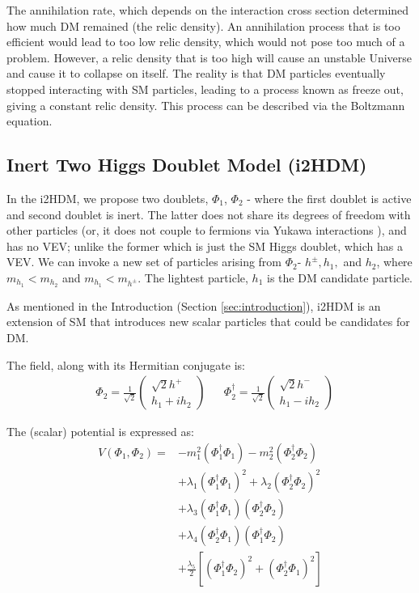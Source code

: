 \documentclass[12pt]{article}
\begin{document}
The annihilation rate, which depends on the interaction cross section determined how much DM remained (the relic density). An annihilation process that is too efficient would lead to too low relic density, which would not pose too much of a problem. However, a relic density that is too high will cause an unstable Universe and cause it to collapse on itself. The reality is that DM particles eventually stopped interacting with SM particles, leading to a process known as freeze out, giving a constant relic density. This process can be described via the Boltzmann equation.

\subsection{Inert Two Higgs Doublet Model (i2HDM)}
\label{sec:i2HDM}
In the i2HDM, we propose two doublets, $\Phi_1$, $\Phi_2$ - where the first doublet is active and second doublet is inert. The latter does not share its degrees of freedom with other particles (or, it does not couple to fermions via Yukawa interactions \cite{Belyaev_2022}), and has no VEV; unlike the former which is just the SM Higgs doublet, which has a VEV. We can invoke a new set of particles arising from $\Phi_2$- $h^\pm, h_1,$ and $h_2$, where $m_{h_1} < m_{h_2}$ and $m_{h_1} < m_{h^\pm}$. The lightest particle, $h_1$ is the DM candidate particle.

As mentioned in the Introduction (Section \ref{sec:introduction}), i2HDM is an extension of SM that introduces new scalar particles that could be candidates for DM.

The field, along with its Hermitian conjugate is:
\begin{align}
    &\Phi_2 = \frac{1}{\sqrt{2}}
        \begin{pmatrix}
            {\sqrt{2}h^+} \\
            {h_1 + ih_2 }
        \end{pmatrix}&
    &\Phi_2^\dagger = \frac{1}{\sqrt{2}} 
        \begin{pmatrix}
            {\sqrt{2}h^-} \\
            {h_1 - ih_2 }
        \end{pmatrix}
\end{align} 

The (scalar) potential is expressed as:
\begin{equation}
    \begin{split}
        V(\Phi_1, \Phi_2) =& -m_1^2(\Phi_1^\dagger\Phi_1) - m_2^2(\Phi_2^\dagger\Phi_2)\\ 
        &+ \lambda_1(\Phi_1^\dagger\Phi_1)^2 + \lambda_2(\Phi_2^\dagger\Phi_2)^2 \\
        &+ \lambda_3(\Phi_1^\dagger\Phi_1)(\Phi_2^\dagger\Phi_2) \\
        &+ \lambda_4(\Phi_2^\dagger\Phi_1)(\Phi_1^\dagger\Phi_2)\\ 
        &+ \frac{\lambda_5}{2}[(\Phi_1^\dagger\Phi_2)^2 + (\Phi_2^\dagger\Phi_1)^2]
        \end{split}
        \label{eq:higgs_potential}
\end{equation}
\end{document}
